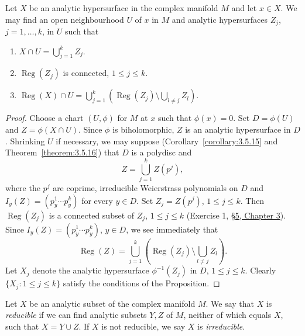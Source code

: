  Let $X$ be an analytic hypersurface in the complex manifold $M$ and let $x\in X$. We may find an open neighbourhood $U$ of $x$ in $M$ and analytic hypersurfaces $Z_j$, $j=1,\ldots,k$, in $U$ such that
\begin{enumerate}
\item $\displaystyle X\cap U=\bigcup_{j=1}^k Z_j$.
\item $\operatorname{Reg}(Z_j)$ is connected, $1\leq j\leq k$.
\item $\displaystyle\operatorname{Reg}(X)\cap U=\bigcup_{j=1}^k\left(\operatorname{Reg}(Z_j)\setminus\bigcup_{l\neq j}Z_l\right)$.
\end{enumerate}
\begin{proof}
Choose a chart $(U,\phi)$ for $M$ at $x$ such that $\phi(x)=0$. Set $D=\phi(U)$ and $Z=\phi(X\cap U)$. Since $\phi$ is biholomorphic, $Z$ is an analytic hypersurface in $D$. Shrinking $U$ if necessary, we may suppose (Corollary~\ref{corollary:3.5.15} and Theorem~\ref{theorem:3.5.16}) that $D$ is a polydisc and
\[
Z=\bigcup_{j=1}^k Z(p^j),
\]
where the $p^j$ are coprime, irreducible Weierstrass polynomials on $D$ and $I_y(Z)=(p_y^1\cdots p_y^k)$ for every $y\in D$. Set $Z_j=Z(p^j)$, $1\leq j\leq k$. Then $\operatorname{Reg}(Z_j)$ is a connected subset of $Z_j$, $1\leq j\leq k$ (Exercise 1, \hyperref[sec:3:5]{\S5, Chapter 3}). Since $I_y(Z)=(p_y^1\cdots p_y^k)$, $y\in D$, we see immediately that
\[
\operatorname{Reg}(Z)=\bigcup_{j=1}^k\left(\operatorname{Reg}(Z_j)\setminus\bigcup_{l\neq j}Z_l\right).
\]
Let $X_j$ denote the analytic hypersurface $\phi^{-1}(Z_j)$ in $D$, $1\leq j\leq k$. Clearly $\{X_j:1\leq j\leq k\}$ satisfy the conditions of the Proposition.
\end{proof}
 Let $X$ be an analytic subset of the complex manifold $M$. We say that $X$ is \emph{reducible} if we can find analytic subsets $Y,Z$ of $M$, neither of which equals $X$, such that $X=Y\cup Z$. If $X$ is not reducible, we say $X$ is \emph{irreducible}.

